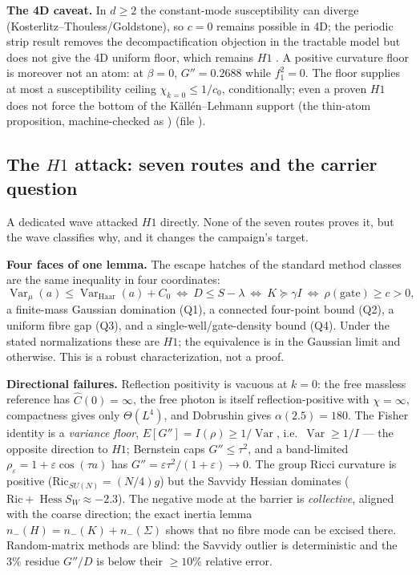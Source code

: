 \textbf{The 4D caveat.} In $d\ge2$ the constant-mode susceptibility can diverge
(Kosterlitz--Thouless/Goldstone), so $c=0$ remains possible in 4D; the periodic strip result removes
the decompactification objection in the tractable model but does not give the 4D uniform floor, which
remains $H1$ \LM. A positive curvature floor is moreover not an atom: at $\beta=0$, $G''=0.2688$
while $f_1^2=0$. The floor supplies at most a susceptibility ceiling $\chi_{k=0}\le1/c_0$,
conditionally; even a proven $H1$ does not force the bottom of the K\"all\'en--Lehmann support (the
thin-atom proposition, machine-checked as ) (file
).

\subsection{The $H1$ attack: seven routes and the carrier question}

A dedicated wave attacked $H1$ directly. None of the seven routes proves it, but the wave classifies
why, and it changes the campaign's target.

\textbf{Four faces of one lemma.} The escape hatches of the standard method classes are the same
inequality in four coordinates:
\begin{equation}
  \operatorname{Var}_\mu(a)\le\operatorname{Var}_{\mathrm{Haar}}(a)+C_0
  \ \Longleftrightarrow\
  D\le S-\lambda
  \ \Longleftrightarrow\
  K\succeq\gamma I
  \ \Longleftrightarrow\
  \rho(\text{gate})\ge c>0,
  \label{eq:v3fourfaces}
\end{equation}
a finite-mass Gaussian domination (Q1), a connected four-point bound (Q2), a uniform fibre gap (Q3),
and a single-well/gate-density bound (Q4). Under the stated normalizations these are $H1$; the
equivalence is \LT{} in the Gaussian limit and \LC{} otherwise. This is a robust characterization, not
a proof.

\textbf{Directional failures.} Reflection positivity is vacuous at $k=0$: the free massless reference
has $\hat C(0)=\infty$, the free photon is itself reflection-positive with $\chi=\infty$, compactness
gives only $\Theta(L^4)$, and Dobrushin gives $\alpha(2.5)=180$. The Fisher identity is a
\emph{variance floor}, $E[G'']=I(\rho)\ge1/\operatorname{Var}$, i.e.\
$\operatorname{Var}\ge1/I$ --- the opposite direction to $H1$; Bernstein caps $G''\le\tau^2$, and a
band-limited $\rho_\varepsilon=1+\varepsilon\cos(\tau a)$ has
$G''=\varepsilon\tau^2/(1+\varepsilon)\to0$. The group Ricci curvature is positive
($\mathrm{Ric}_{SU(N)}=(N/4)g$) but the Savvidy Hessian dominates
($\mathrm{Ric}+\operatorname{Hess}S_W\approx-2.3$). The negative mode at the barrier is
\emph{collective}, aligned with the coarse direction; the exact inertia lemma
$n_-(H)=n_-(K)+n_-(\Sigma)$ shows that no fibre mode can be excised there. Random-matrix methods
are blind: the Savvidy outlier is deterministic and the $3\%$ residue $G''/D$ is below their
$\ge10\%$ relative error.

